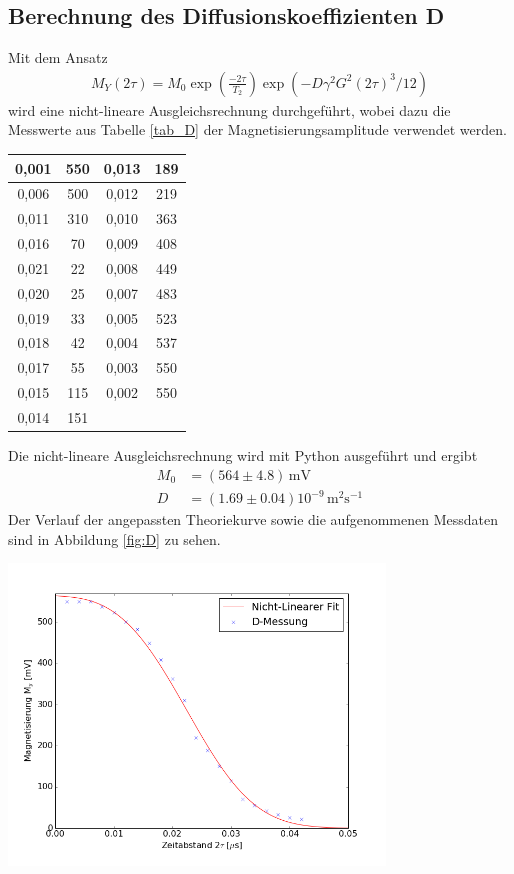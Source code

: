 \documentclass[]{scrartcl}
\begin{document}
\subsection{Berechnung des Diffusionskoeffizienten D}
Mit dem Ansatz
\begin{align*}
M_Y(2\tau)=M_0\exp\left( \frac{-2\tau}{T_2}\right) \exp(-D\gamma^2G^2(2\tau)^3/12)
\end{align*}
wird eine nicht-lineare Ausgleichsrechnung durchgeführt, wobei dazu die Messwerte aus Tabelle \ref{tab_D} der Magnetisierungsamplitude verwendet werden. \\
\begin{center}
	\begin{tabular}{|c|c|c|c|}
		\hline	0,001	&	550	&	0,013	&	189	\\
		\hline	0,006	&	500	&	0,012	&	219	\\
		\hline	0,011	&	310	&	0,010	&	363	\\
		\hline	0,016	&	70	&	0,009	&	408	\\
		\hline	0,021	&	22	&	0,008	&	449	\\
		\hline	0,020	&	25	&	0,007	&	483	\\
		\hline	0,019	&	33	&	0,005	&	523	\\
		\hline	0,018	&	42	&	0,004	&	537	\\
		\hline	0,017	&	55	&	0,003	&	550	\\
		\hline	0,015	&	115	&	0,002	&	550	\\
		\hline	0,014	&	151	&		&		\\
		\hline
	\end{tabular}
	\label{tab_D}
\end{center}
Die nicht-lineare Ausgleichsrechnung wird mit Python ausgeführt und ergibt 
\begin{align*}
M_0&=(564 \pm 4.8)\,\text{mV}\\
D&=(1.69 \pm 0.04) 10^{-9}\,\text{m$^2$s$^{-1}$}
\end{align*}
Der Verlauf der angepassten Theoriekurve sowie die aufgenommenen Messdaten sind in Abbildung \ref{fig:D} zu sehen.
\begin{center}
	\includegraphics[width=10cm]{images/plotD.png}
	\label{fig:D}
\end{center}
\end{document}
